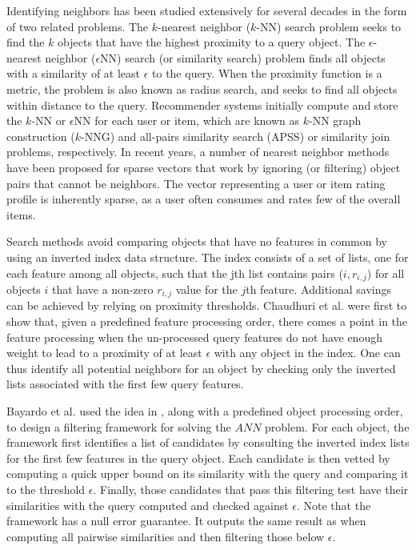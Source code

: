 \documentclass[conference, 12pt]{IEEEtran}
\begin{document}
Identifying neighbors has been studied extensively for several decades in the form of two related problems. The $k$-nearest neighbor ($k$-NN) search problem seeks to find the $k$ objects that have the highest proximity to a query object.
The ${\epsilon}$-nearest neighbor (${\epsilon}$NN) search (or similarity search) problem finds all objects with a similarity of at least ${\epsilon}$ to the query. When the proximity function is a metric, the problem is also known as radius search, and seeks to find all objects within  distance to the query. Recommender systems initially compute and store the $k$-NN or ${\epsilon}$NN for each user or item, which are known as $k$-NN graph construction ($k$-NNG) and all-pairs similarity search (APSS) or similarity join problems, respectively.
In recent years, a number of nearest neighbor methods have been proposed for sparse vectors that work by ignoring (or filtering) object pairs that cannot be neighbors. The vector representing a user or item rating profile is inherently sparse, as a user often consumes and rates few of the overall items.

Search methods avoid comparing objects that have no features in common by
using an inverted index data structure. The index consists of a set of lists, one
for each feature among all objects, such that the jth list contains pairs ($i, r_{i,j}$)
for all objects ${i}$ that have a non-zero $r_{i,j}$ value for the $j$th feature. Additional
savings can be achieved by relying on proximity thresholds. Chaudhuri et al. \cite{chaudhuri}
were first to show that, given a predefined feature processing order, there comes
a point in the feature processing when the un-processed query features do not
have enough weight to lead to a proximity of at least ${\epsilon}$ with any object in the
index. One can thus identify all potential neighbors for an object by checking
only the inverted lists associated with the first few query features.

Bayardo et al. \cite{Bayardo}  used the idea in \cite{Chaudhuri:2006}, along with a predefined object
processing order, to design a filtering framework for solving the $ANN$ problem.
For each object, the framework first identifies a list of candidates by consulting
the inverted index lists for the first few features in the query object. Each
candidate is then vetted by computing a quick upper bound on its similarity
with the query and comparing it to the threshold $\epsilon$. Finally, those candidates
that pass this filtering test have their similarities with the query computed and
checked against $\epsilon$. Note that the framework has a null error guarantee. It
outputs the same result as when computing all pairwise similarities and then
filtering those below $\epsilon$.
\end{document}
